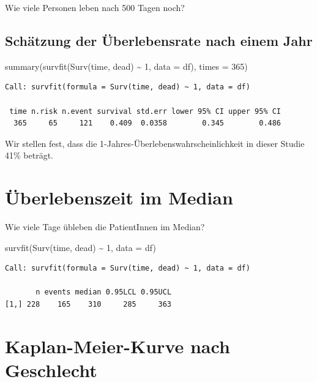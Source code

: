 \documentclass[
  letterpaper,
  DIV=11,
  numbers=noendperiod]{scrartcl}
\newenvironment{Shaded}{\begin{snugshade}}{\end{snugshade}}
\newcommand{\AttributeTok}[1]{\textcolor[rgb]{0.40,0.45,0.13}{#1}}
\newcommand{\DecValTok}[1]{\textcolor[rgb]{0.68,0.00,0.00}{#1}}
\newcommand{\FunctionTok}[1]{\textcolor[rgb]{0.28,0.35,0.67}{#1}}
\newcommand{\NormalTok}[1]{\textcolor[rgb]{0.00,0.23,0.31}{#1}}
\newcommand{\SpecialCharTok}[1]{\textcolor[rgb]{0.37,0.37,0.37}{#1}}
\begin{document}
Wie viele Personen leben nach 500 Tagen noch?

\subsection{Schätzung der Überlebensrate nach einem
Jahr}\label{schuxe4tzung-der-uxfcberlebensrate-nach-einem-jahr}

\begin{Shaded}
\begin{Highlighting}[]
\FunctionTok{summary}\NormalTok{(}\FunctionTok{survfit}\NormalTok{(}\FunctionTok{Surv}\NormalTok{(time, dead) }\SpecialCharTok{\textasciitilde{}} \DecValTok{1}\NormalTok{, }\AttributeTok{data =}\NormalTok{ df), }\AttributeTok{times =} \DecValTok{365}\NormalTok{)}
\end{Highlighting}
\end{Shaded}

\begin{verbatim}
Call: survfit(formula = Surv(time, dead) ~ 1, data = df)

 time n.risk n.event survival std.err lower 95% CI upper 95% CI
  365     65     121    0.409  0.0358        0.345        0.486
\end{verbatim}

Wir stellen fest, dass die 1-Jahres-Überlebenswahrscheinlichkeit in
dieser Studie 41\% beträgt.

\section{Überlebenszeit im Median}\label{uxfcberlebenszeit-im-median}

Wie viele Tage übleben die PatientInnen im Median?

\begin{Shaded}
\begin{Highlighting}[]
\FunctionTok{survfit}\NormalTok{(}\FunctionTok{Surv}\NormalTok{(time, dead) }\SpecialCharTok{\textasciitilde{}} \DecValTok{1}\NormalTok{, }\AttributeTok{data =}\NormalTok{ df)}
\end{Highlighting}
\end{Shaded}

\begin{verbatim}
Call: survfit(formula = Surv(time, dead) ~ 1, data = df)

       n events median 0.95LCL 0.95UCL
[1,] 228    165    310     285     363
\end{verbatim}

\section{Kaplan-Meier-Kurve nach
Geschlecht}\label{kaplan-meier-kurve-nach-geschlecht}
\end{document}
